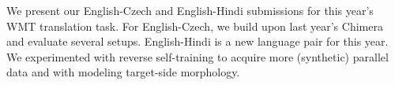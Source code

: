 We present our English-Czech and English-Hindi submissions for this year's WMT translation task. For English-Czech, we build upon last year's Chimera and evaluate several setups. English-Hindi is a new language pair for this year. We experimented with reverse self-training to acquire more (synthetic) parallel data and with modeling target-side morphology.
